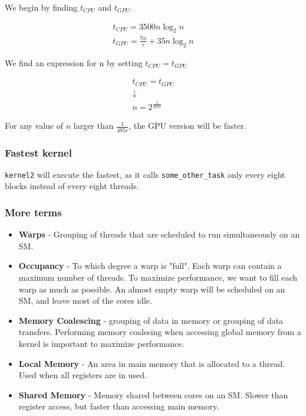 \documentclass[paper=a4, fontsize=11pt]{scrartcl} %
\numberwithin{equation}{section} %
\numberwithin{figure}{section} %
\numberwithin{table}{section} %
\begin{document}
We begin by finding $t_{CPU}$ and $t_{GPU}$.

\begin{gather*}
    t_{CPU} = 3500n\log_{2} n \\
    t_{GPU} = \frac{7n}{r} + 35n\log_{2} n
\end{gather*}

We find an expression for n by setting $t_{CPU} = t_{GPU}$

\begin{gather*}
    t_{CPU} = t_{GPU} \\
    \downarrow \\
    n = 2^{\frac{1}{495r}}
\end{gather*}

For any value of $n$ larger than $\frac{1}{495r}$, the GPU version will be faster.

\subsubsection{Fastest kernel}

\texttt{kernel2} will execute the fastest, as it calls \texttt{some\_other\_task} only every eight blocks instead of every eight threads.

\subsubsection{More terms}

\begin{itemize}
    \item \textbf{Warps} - Grouping of threads that are scheduled to run simultaneously on an SM.
    \item \textbf{Occupancy} - To which degree a warp is "full". Each warp can contain a maximum number of threads. To maximize performance, we want to fill each warp as much as possible. An almost empty warp will be scheduled on an SM, and leave most of the cores idle.
    \item \textbf{Memory Coalescing} - grouping of data in memory or grouping of data transfers. Performing memory coalesing when accessing global memory from a kernel is important to maximize performance.
    \item \textbf{Local Memory} - An area in main memory that is allocated to a thread. Used when all registers are in used.
    \item \textbf{Shared Memory} - Memory shared between cores on an SM. Slower than register access, but faster than accessing main memory.
\end{itemize}
\end{document}
